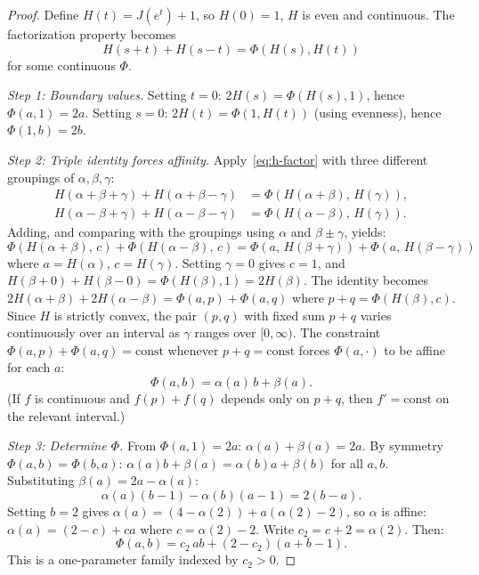 \documentclass[11pt]{article}
\theoremstyle{definition}
\theoremstyle{remark}
\begin{document}
\begin{proof}
Define $H(t) = J(e^t) + 1$, so $H(0) = 1$, $H$ is even and
continuous.
The factorization property becomes
\begin{equation}\label{eq:h-factor}
H(s+t) + H(s-t) = \Phi(H(s), H(t))
\end{equation}
for some continuous $\Phi$.

\medskip
\noindent\emph{Step 1: Boundary values.}
Setting $t = 0$: $2H(s) = \Phi(H(s), 1)$, hence $\Phi(a, 1) = 2a$.
Setting $s = 0$: $2H(t) = \Phi(1, H(t))$ (using evenness), hence
$\Phi(1, b) = 2b$.

\medskip
\noindent\emph{Step 2: Triple identity forces affinity.}
Apply~\eqref{eq:h-factor} with three different groupings of
$\alpha, \beta, \gamma$:
\begin{align*}
H(\alpha + \beta + \gamma) + H(\alpha + \beta - \gamma)
  &= \Phi(H(\alpha + \beta),\, H(\gamma)), \\
H(\alpha - \beta + \gamma) + H(\alpha - \beta - \gamma)
  &= \Phi(H(\alpha - \beta),\, H(\gamma)).
\end{align*}
Adding, and comparing with the groupings using $\alpha$ and
$\beta \pm \gamma$, yields:
\[
\Phi(H(\alpha{+}\beta),\, c) + \Phi(H(\alpha{-}\beta),\, c)
= \Phi(a,\, H(\beta{+}\gamma)) + \Phi(a,\, H(\beta{-}\gamma))
\]
where $a = H(\alpha)$, $c = H(\gamma)$.
Setting $\gamma = 0$ gives $c = 1$, and $H(\beta + 0) + H(\beta - 0)
= \Phi(H(\beta), 1) = 2H(\beta)$.
The identity becomes
$2H(\alpha + \beta) + 2H(\alpha - \beta) = \Phi(a, p) + \Phi(a, q)$
where $p + q = \Phi(H(\beta), c)$.
Since $H$ is strictly convex, the pair $(p, q)$ with fixed sum
$p + q$ varies continuously over an interval as $\gamma$ ranges
over $[0, \infty)$.
The constraint
$\Phi(a, p) + \Phi(a, q) = \text{const}$ whenever $p + q = \text{const}$
forces $\Phi(a, \cdot)$ to be affine for each $a$:
\[
\Phi(a, b) = \alpha(a)\, b + \beta(a).
\]
(If $f$ is continuous and $f(p) + f(q)$ depends only on $p + q$,
then $f' = \text{const}$ on the relevant interval.)

\medskip
\noindent\emph{Step 3: Determine $\Phi$.}
From $\Phi(a, 1) = 2a$: $\alpha(a) + \beta(a) = 2a$.
By symmetry $\Phi(a, b) = \Phi(b, a)$:
$\alpha(a)b + \beta(a) = \alpha(b)a + \beta(b)$ for all $a, b$.
Substituting $\beta(a) = 2a - \alpha(a)$:
\[
\alpha(a)(b - 1) - \alpha(b)(a - 1) = 2(b - a).
\]
Setting $b = 2$ gives $\alpha(a) = (4 - \alpha(2)) +
a(\alpha(2) - 2)$, so $\alpha$ is affine:
$\alpha(a) = (2 - c) + ca$ where $c = \alpha(2) - 2$.
Write $c_2 = c + 2 = \alpha(2)$.
Then:
\begin{equation}\label{eq:phi-family}
\Phi(a, b) = c_2\, a b + (2 - c_2)(a + b - 1).
\end{equation}
This is a one-parameter family indexed by $c_2 > 0$.


\end{proof}
\end{document}
